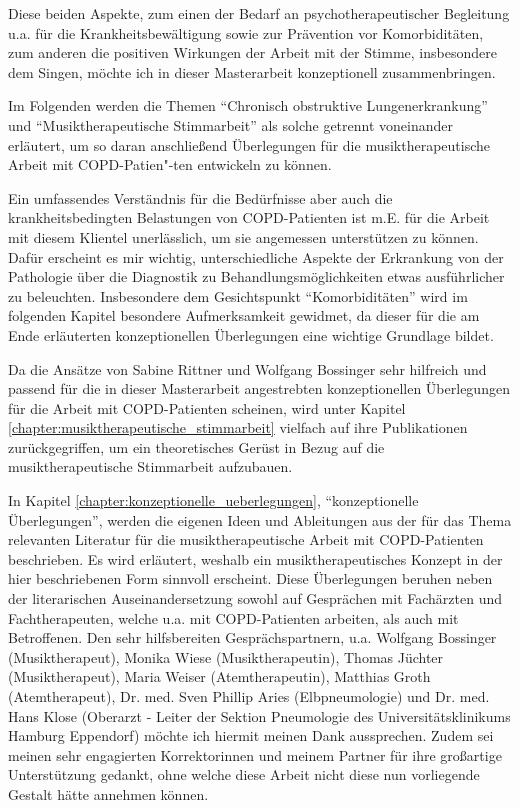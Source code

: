 Diese beiden Aspekte, zum einen der Bedarf an psychotherapeutischer Begleitung u.a. für die Krankheitsbewältigung sowie zur Prävention vor Komorbiditäten, zum anderen die positiven Wirkungen der Arbeit mit der Stimme, insbesondere dem Singen, möchte ich in dieser Masterarbeit konzeptionell zusammenbringen.

Im Folgenden werden die Themen "`Chronisch obstruktive Lungenerkrankung"' und "`Musiktherapeutische Stimmarbeit"' als solche getrennt voneinander erläutert, um so daran anschließend Überlegungen für die musiktherapeutische Arbeit mit COPD-Patien"-ten entwickeln zu können.

Ein umfassendes Verständnis für die Bedürfnisse aber auch die krankheitsbedingten Belastungen von COPD-Patienten ist m.E. für die Arbeit mit diesem Klientel unerlässlich, um sie angemessen unterstützen zu können. Dafür erscheint es mir wichtig, unterschiedliche Aspekte der Erkrankung von der Pathologie über die Diagnostik zu Behandlungsmöglichkeiten etwas ausführlicher zu beleuchten. Insbesondere dem Gesichtspunkt "`Komorbiditäten"' wird im folgenden Kapitel besondere Aufmerksamkeit gewidmet, da dieser für die am Ende erläuterten konzeptionellen Überlegungen eine wichtige Grundlage bildet.

Da die Ansätze von Sabine Rittner und Wolfgang Bossinger sehr hilfreich und passend für die in dieser Masterarbeit angestrebten konzeptionellen Überlegungen für die Arbeit mit COPD-Patienten scheinen, wird unter Kapitel  \ref{chapter:musiktherapeutische_stimmarbeit} vielfach auf ihre Publikationen zurückgegriffen, um ein theoretisches Gerüst in Bezug auf die musiktherapeutische Stimmarbeit aufzubauen.

In Kapitel \ref{chapter:konzeptionelle_ueberlegungen}, "`konzeptionelle Überlegungen"', werden die eigenen Ideen und Ableitungen aus der für das Thema relevanten Literatur für die musiktherapeutische Arbeit mit COPD-Patienten beschrieben. Es wird erläutert, weshalb ein musiktherapeutisches Konzept in der hier beschriebenen Form sinnvoll erscheint. Diese Überlegungen beruhen neben der literarischen Auseinandersetzung sowohl auf Gesprächen mit Fachärzten und Fachtherapeuten, welche u.a. mit COPD-Patienten arbeiten, als auch mit Betroffenen. Den sehr hilfsbereiten Gesprächspartnern, u.a. Wolfgang Bossinger (Musiktherapeut), Monika Wiese (Musiktherapeutin), Thomas Jüchter (Musiktherapeut), Maria Weiser (Atemtherapeutin), Matthias Groth (Atemtherapeut), Dr. med. Sven Phillip Aries (Elbpneumologie) und Dr. med. Hans Klose (Oberarzt - Leiter der Sektion Pneumologie des Universitätsklinikums Hamburg Eppendorf) möchte ich hiermit meinen Dank aussprechen. Zudem sei meinen sehr engagierten Korrektorinnen und meinem Partner für ihre großartige Unterstützung gedankt, ohne welche diese Arbeit nicht diese nun vorliegende Gestalt hätte annehmen können.

\newpage\thispagestyle{empty}